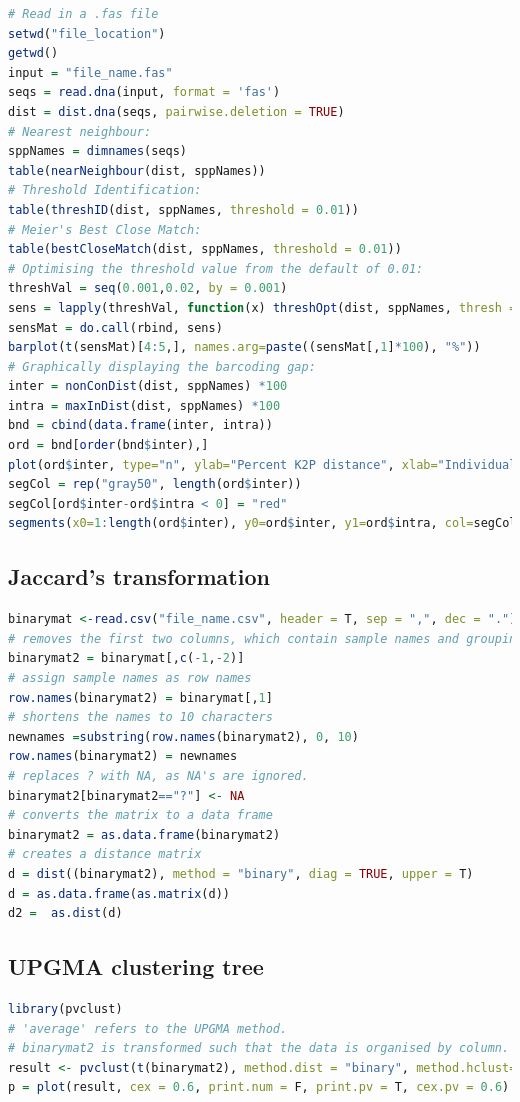 \begin{lstlisting}[language=R]
# Read in a .fas file
setwd("file_location")
getwd()
input = "file_name.fas"
seqs = read.dna(input, format = 'fas')
dist = dist.dna(seqs, pairwise.deletion = TRUE)
# Nearest neighbour:
sppNames = dimnames(seqs)
table(nearNeighbour(dist, sppNames))
# Threshold Identification:
table(threshID(dist, sppNames, threshold = 0.01))
# Meier's Best Close Match:
table(bestCloseMatch(dist, sppNames, threshold = 0.01))
# Optimising the threshold value from the default of 0.01:
threshVal = seq(0.001,0.02, by = 0.001)
sens = lapply(threshVal, function(x) threshOpt(dist, sppNames, thresh = x))
sensMat = do.call(rbind, sens)
barplot(t(sensMat)[4:5,], names.arg=paste((sensMat[,1]*100), "%"))
# Graphically displaying the barcoding gap:
inter = nonConDist(dist, sppNames) *100
intra = maxInDist(dist, sppNames) *100
bnd = cbind(data.frame(inter, intra))
ord = bnd[order(bnd$inter),]
plot(ord$inter, type="n", ylab="Percent K2P distance", xlab="Individual")
segCol = rep("gray50", length(ord$inter))
segCol[ord$inter-ord$intra < 0] = "red" 
segments(x0=1:length(ord$inter), y0=ord$inter, y1=ord$intra, col=segCol, lwd=6)
\end{lstlisting}

\subsection{Jaccard's transformation}
\label{appendix:RCODE,Jaccard}
\begin{lstlisting}[language=R]
binarymat <-read.csv("file_name.csv", header = T, sep = ",", dec = ".")
# removes the first two columns, which contain sample names and grouping information
binarymat2 = binarymat[,c(-1,-2)] 
# assign sample names as row names 
row.names(binarymat2) = binarymat[,1] 
# shortens the names to 10 characters
newnames =substring(row.names(binarymat2), 0, 10) 
row.names(binarymat2) = newnames
# replaces ? with NA, as NA's are ignored.
binarymat2[binarymat2=="?"] <- NA 
# converts the matrix to a data frame 
binarymat2 = as.data.frame(binarymat2) 
# creates a distance matrix
d = dist((binarymat2), method = "binary", diag = TRUE, upper = T) 
d = as.data.frame(as.matrix(d))
d2 =  as.dist(d)

\end{lstlisting}

\subsection{UPGMA clustering tree}
\label{appendix:RCODE,upgma}
\begin{lstlisting}[language=R]
library(pvclust)
# 'average' refers to the UPGMA method. 
# binarymat2 is transformed such that the data is organised by column.
result <- pvclust(t(binarymat2), method.dist = "binary", method.hclust="average", nboot=1000) 
p = plot(result, cex = 0.6, print.num = F, print.pv = T, cex.pv = 0.6)

\end{lstlisting}

